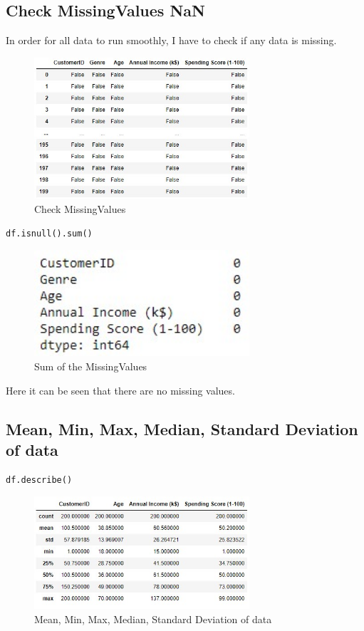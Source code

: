 \documentclass{article}
\begin{document}
\subsection{Check MissingValues NaN}

In order for all data to run smoothly, I have to check if any data is missing.

\begin{figure}[htp]
    \centering
    \includegraphics[width=8cm]{MissingValue.jpg}
    \caption{Check MissingValues}
    \label{fig:MissingValue}
\end{figure}

\begin{lstlisting}
df.isnull().sum()
\end{lstlisting}

\begin{figure}[htp]
    \centering
    \includegraphics[width=8cm]{MissingValue1.jpg}
    \caption{Sum of the MissingValues}
    \label{fig:Sum of the MissingValues }
\end{figure}

Here it can be seen that there are no missing values.

\subsection{Mean, Min, Max, Median, Standard Deviation of data}

\begin{lstlisting}
df.describe()
\end{lstlisting}

\begin{figure}[htp]
    \centering
    \includegraphics[width=8cm]{Min, Max.jpg}
    \caption{Mean, Min, Max, Median, Standard Deviation of data}
    \label{fig:Mean, Min, Max, Median, Standard Deviation of data}
\end{figure}
\end{document}
